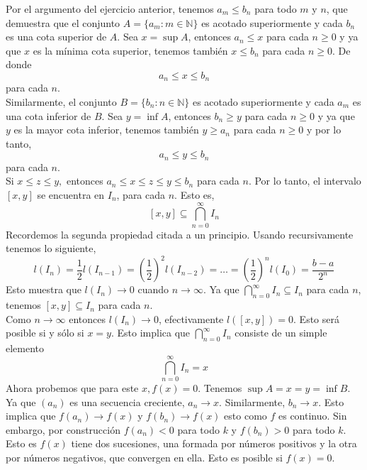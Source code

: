 \begin{enumerate}[\bfseries 1.]
	Por el argumento del ejercicio anterior, tenemos $a_m\leq b_n$ para todo $m$ y $n$, que demuestra que el conjunto $A=\lbrace a_m : m\in \mathbb{N} \rbrace$ es acotado superiormente y cada $b_n$ es una cota superior de $A$. Sea $x=\sup A$, entonces $a_n\leq x$ para cada $n\geq 0$ y ya que $x$ es la mínima cota superior, tenemos también $x\leq b_n$ para cada $n\geq 0$. De donde 
	$$a_n\leq x \leq b_n$$
	para cada $n$.\\
	Similarmente, el conjunto $B=\lbrace b_n : n\in \mathbb{N} \rbrace$ es acotado superiormente y cada $a_m$ es una cota inferior de $B$. Sea $y=\inf A$, entonces $b_n\geq y$ para cada $n\geq 0$ y ya que $y$ es la mayor cota inferior, tenemos también $y\geq a_n$ para cada $n\geq 0$ y por lo tanto,
	$$a_n\leq y \leq b_n$$
	para cada $n$.\\
	Si $x\leq z \leq y,$ entonces $a_n\leq x \leq z \leq y \leq b_n$ para cada $n$. Por lo tanto, el intervalo $[x,y]$ se encuentra en $I_n$, para cada $n$. Esto es,
	$$[x,y]\subseteq \bigcap_{n=0}^{\infty} I_n$$
	Recordemos la segunda propiedad citada a un principio. Usando recursivamente tenemos lo siguiente,
	$$l(I_n) = \dfrac{1}{2}l \left(I_{n-1}\right) = \left(\dfrac{1}{2}\right)^2 l\left(I_{n-2}\right) = \ldots = \left(\dfrac{1}{2}\right)^nl(I_0) = \dfrac{b-a}{2^n}$$
	Esto muestra que $l(I_n)\to 0$ cuando $n\to \infty$. Ya que $\displaystyle\bigcap_{n=0}^{\infty} I_n \subseteq I_n$ para cada $n$, tenemos $[x,y]\subseteq I_n$ para cada $n$.\\
	Como $n\to \infty$ entonces $l(I_n)\to 0$, efectivamente $l([x,y])=0$. Esto será posible si y sólo si $x=y.$ Esto implica que $\displaystyle\bigcap_{n=0}^\infty I_n$ consiste de un simple elemento
	$$\bigcap_{n=0}^\infty I_n = {x}$$
	Ahora probemos que para este $x, f(x)=0$. Tenemos $\sup A = x = y = \inf B$. Ya que $(a_n)$ es una secuencia creciente, $a_n\to x.$ Similarmente, $b_n\to x.$ Esto implica que $f(a_n)\to f(x)$ y $f(b_n) \to f(x)$ esto como $f$ es continuo. Sin embargo, por construcción $f(a_n)<0$ para todo $k$ y $f(b_n)>0$ para todo $k$. Esto es $f(x)$ tiene dos sucesiones, una formada por números positivos y la otra por números negativos, que convergen en ella. Esto es posible si $f(x)=0.$\\\\


\end{enumerate}
